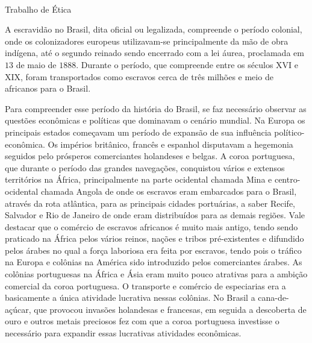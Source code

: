 \documentclass[a4paper,12pt]{article}
\begin{document}
{
\begin{center}{\huge {\color{red}{Escravidão no Brasil}}}\\{\large Trabalho de Ética}\end{center}

\vspace*{1cm}

A escravidão no Brasil, dita oficial ou legalizada, compreende o período colonial, onde os colonizadores europeus utilizavam-se principalmente da mão de obra indígena, até o segundo reinado sendo encerrado com a lei áurea, proclamada em $13$ de maio de $1888$. Durante o período, que compreende entre os séculos XVI e XIX, foram transportados como escravos cerca de três milhões e meio de africanos para o Brasil.%

Para compreender esse período da história do Brasil, se faz necessário observar as questões econômicas e políticas que dominavam o cenário mundial. Na Europa os principais estados começavam um período de expansão de sua influência político-econômica. Os impérios britânico, francês e espanhol disputavam a hegemonia seguidos pelo prósperos comerciantes holandeses e belgas. A coroa portuguesa, que durante o período das grandes navegações, conquistou vários e extensos territórios na África, principalmente na parte ocidental chamada Mina e centro-ocidental chamada Angola de onde os escravos eram embarcados para o Brasil, através da rota atlântica, para as principais cidades portuárias, a saber Recife, Salvador e Rio de Janeiro de onde eram distribuídos para as demais regiões. Vale destacar que o comércio de escravos africanos é muito mais antigo, tendo sendo praticado na África pelos vários reinos, nações e tribos pré-existentes e difundido pelos árabes no qual a força laboriosa era feita por escravos, tendo pois o tráfico na Europa e colônias na América sido introduzido pelos comerciantes árabes. As colônias portuguesas na África e Ásia eram muito pouco atrativas para a ambição comercial da coroa portuguesa. O transporte e comércio de especiarias era a basicamente a única atividade lucrativa nessas colônias. No Brasil a cana-de-açúcar, que provocou invasões holandesas e francesas, em seguida a descoberta de ouro e outros metais preciosos fez com que a coroa portuguesa investisse o necessário para expandir essas lucrativas atividades econômicas.

}
\end{document}
